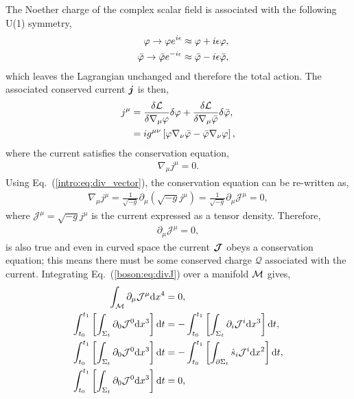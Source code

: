 The Noether charge of the complex scalar field is associated with the following U(1) symmetry,
\begin{align}
\varphi \rightarrow \varphi e^{i\epsilon} &\approx \varphi + i\epsilon \varphi , \\ 
\quad\bar{\varphi} \rightarrow \bar{\varphi} e^{-i\epsilon}  &\approx \bar{\varphi} - i\epsilon \bar{\varphi},
\end{align}
which leaves the Lagrangian unchanged and therefore the total action. The associated conserved current $\boldsymbol{j}$ is then,
\begin{align} 
j^\mu &= \frac{\delta \mathcal{L}}{\delta \nabla_\mu\varphi}\delta \varphi + \frac{\delta \mathcal{L}}{\delta \nabla_\mu \bar{\varphi}}\delta \bar{\varphi},\\
 &=  ig^{\mu\nu}\left[\varphi\nabla_\nu\bar{\varphi} - \bar{\varphi}\nabla_\nu\varphi\right],
  \end{align}
  where the current satisfies the conservation equation,
\begin{align}
\nabla_\mu j^\mu = 0.
 \end{align}
Using Eq.~(\ref{intro:eq:div_vector}), the conservation equation can be re-written as,
\begin{align}
\nabla_\mu j^\mu = \frac{1}{\sqrt{-g}} \partial_\mu \left( \sqrt{-g} j^\mu \right) = \frac{1}{\sqrt{-g}} \partial_\mu \mathcal{J}^\mu = 0,
 \end{align}
 where $\mathcal{J}^\mu = \sqrt{-g}j^\mu$ is the current expressed as a tensor density. Therefore,
\begin{align}
\partial_\mu \mathcal{J}^\mu =0,\label{boson:eq:divJ}
 \end{align}
is also true and even in curved space the current $\boldsymbol{\mathcal{J}}$ obeys a conservation equation; this means there must be some conserved charge $\mathcal{Q}$ associated with the current. Integrating Eq.~(\ref{boson:eq:divJ}) over a manifold $\mathcal{M}$ gives,
\begin{align}
 \int_{\mathcal{M}}\partial_\mu \mathcal{J}^\mu \dd x^4&=0, \\ 
 \int^{t_1}_{t_0}\left[\int_{\Sigma_t} \partial_0 \mathcal{J}^0 \dd x^3 \right]\dd t &= -\int^{t_1}_{t_0}\left[\int_{\Sigma_t} \partial_i \mathcal{J}^i \dd x^3 \right]\dd t , \\
  \int^{t_1}_{t_0}\left[\int_{\Sigma_t} \partial_0 \mathcal{J}^0 \dd x^3 \right]\dd t &= -\int^{t_1}_{t_0}\left[\int_{\partial \Sigma_t} \hat{s}_i \mathcal{J}^i \dd x^2 \right]\dd t , \\
\int^{t_1}_{t_0}\left[\int_{\Sigma_t} \partial_0 \mathcal{J}^0 \dd x^3 \right]\dd t &= 0 \label{boson:eq:halfwaypointQ} ,
\end{align}

